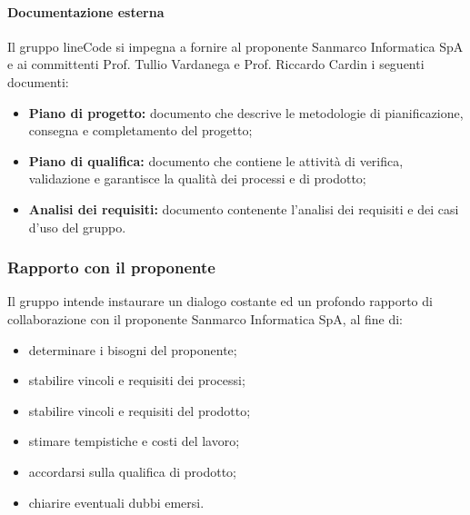 \documentclass[]{article}
\begin{document}
						\paragraph{Documentazione esterna}
						 Il gruppo lineCode si impegna a fornire al proponente Sanmarco Informatica SpA e ai committenti Prof. Tullio Vardanega e Prof. Riccardo Cardin i seguenti documenti:
						 \begin{itemize}
						 	\item \textbf{Piano di progetto:} documento che descrive le metodologie di pianificazione, consegna e completamento del progetto;
						 	\item \textbf{Piano di qualifica:} documento che contiene le attività di verifica, validazione e garantisce la qualità dei processi e di prodotto;
						 	\item \textbf{Analisi dei requisiti:} documento contenente l'analisi dei requisiti e dei casi d'uso del gruppo.
						 \end{itemize}

					\subsubsection{Rapporto con il proponente}
						Il gruppo intende instaurare un dialogo costante ed un profondo rapporto di collaborazione con il proponente Sanmarco Informatica SpA, al fine di:
						\begin{itemize}
							\item determinare i bisogni del proponente;
							\item stabilire vincoli e  requisiti dei processi;
							\item stabilire vincoli e requisiti del prodotto;
							\item stimare tempistiche e costi del lavoro;
							\item accordarsi sulla qualifica di prodotto;
							\item chiarire eventuali dubbi emersi.
						\end{itemize}
\end{document}
